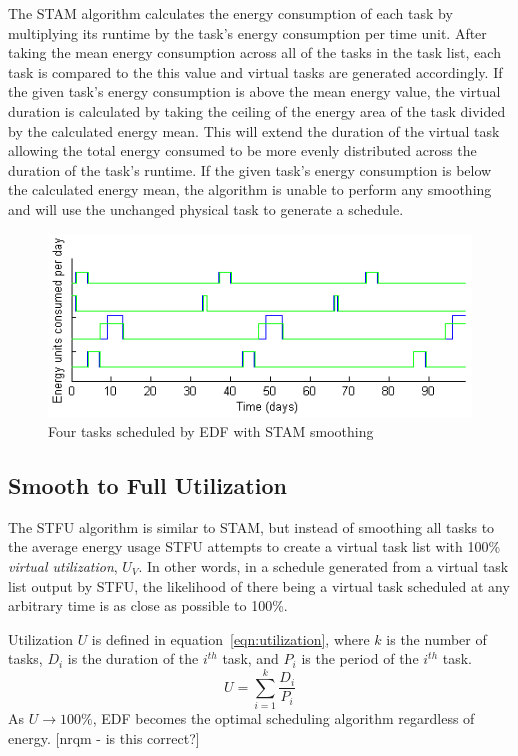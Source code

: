 The \textsc{STAM} algorithm calculates the energy consumption of each task by multiplying its runtime by the task's energy consumption per time unit. After taking the mean energy consumption across all of the tasks in the task list, each task is compared to the this value and virtual tasks are generated accordingly. If the given task's energy consumption is above the mean energy value, the virtual duration is calculated by taking the ceiling of the energy area of the task divided by the calculated energy mean. This will extend the duration of the virtual task allowing the total energy consumed to be more evenly distributed across the duration of the task's runtime. If the given task's energy consumption is below the calculated energy mean, the algorithm is unable to perform any smoothing and  will use the unchanged physical task to generate a schedule.
\begin{figure}[htb]
\includegraphics[scale=0.72]{stamtasks.png}
\caption{Four tasks scheduled by EDF with STAM smoothing}
\label{fig:stamtaskplot}
\end{figure}

\subsection{Smooth to Full Utilization}
The \textsc{STFU} algorithm is similar to STAM, but instead of smoothing all tasks to the average energy usage \textsc{STFU} attempts to create a virtual task list with 100\% \emph{virtual utilization}, $U_V$.  In other words, in a schedule generated from a virtual task list output by \textsc{STFU}, the likelihood of there being a virtual task scheduled at any arbitrary time is as close as possible to 100\%.

Utilization $U$ is defined in equation~\ref{eqn:utilization}, where $k$ is the number of tasks, $D_i$ is the duration of the $i^{th}$ task, and $P_i$ is the period of the $i^{th}$ task.
\begin{equation}
\label{eqn:utilization}
U = \sum_{i=1}^{k} \frac{D_i}{P_i}
\end{equation}
As $U \to 100\%$, EDF becomes the optimal scheduling algorithm regardless of energy. [nrqm - is this correct?]

